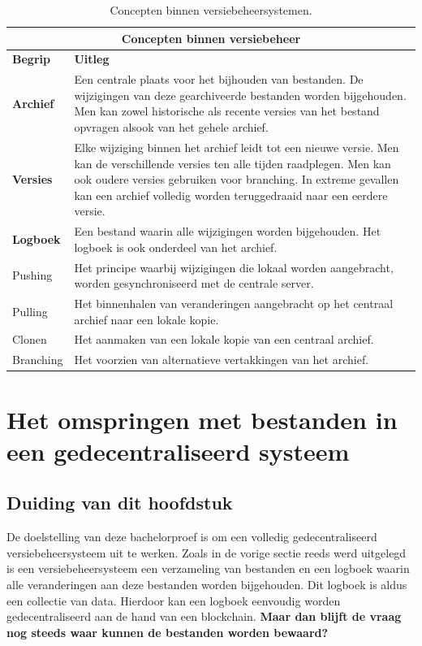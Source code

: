 \begin{table}[h!]
	\centering
	\begin{tabular}{ |p{2cm}|p{12cm}|}
 		\hline
 		\multicolumn{2}{|c|}{\large \textbf{Concepten binnen versiebeheer}} \\
 		\hline
 		\textbf{Begrip}	& \textbf{Uitleg}\\
 		\hline
 		\textbf{Archief} & Een centrale plaats voor het bijhouden van bestanden. De wijzigingen van deze gearchiveerde bestanden worden bijgehouden. Men kan zowel historische als recente versies van het bestand opvragen alsook van het gehele archief.\\
 		\hline
 		\textbf{Versies} & Elke wijziging binnen het archief leidt tot een nieuwe versie. Men kan de verschillende versies ten alle tijden raadplegen. Men kan ook oudere versies gebruiken voor branching. In extreme gevallen kan een archief volledig worden teruggedraaid naar een eerdere versie.\\
 		\hline
		\textbf{Logboek} & Een bestand waarin alle wijzigingen worden bijgehouden. Het logboek is ook onderdeel van het archief. \\
		\hline
		Pushing	& Het principe waarbij wijzigingen die lokaal worden aangebracht, worden gesynchroniseerd met de centrale server.\\
		\hline
		Pulling & Het binnenhalen van veranderingen aangebracht op het centraal archief naar een lokale kopie.\\
		\hline
		Clonen & Het aanmaken van een lokale kopie van een centraal archief. \\
		Branching & Het voorzien van alternatieve vertakkingen van het archief. \\
		\hline
	\end{tabular}
	\label{tbl_concepts}
	\caption{Concepten binnen versiebeheersystemen.}
\end{table}
\newpage
\section{Het omspringen met bestanden in een gedecentraliseerd systeem}
\label{IPFS}
\subsection{Duiding van dit hoofdstuk}
De doelstelling van deze bachelorproef is om een volledig gedecentraliseerd versiebeheersysteem uit te werken. Zoals in de vorige sectie reeds werd uitgelegd is een versiebeheersysteem een verzameling van bestanden en een logboek waarin alle veranderingen aan deze bestanden worden bijgehouden. Dit logboek is aldus een collectie van data. Hierdoor kan een logboek eenvoudig worden gedecentraliseerd aan de hand van een blockchain. \textbf{Maar dan blijft de vraag nog steeds waar kunnen de bestanden worden bewaard?}\\

